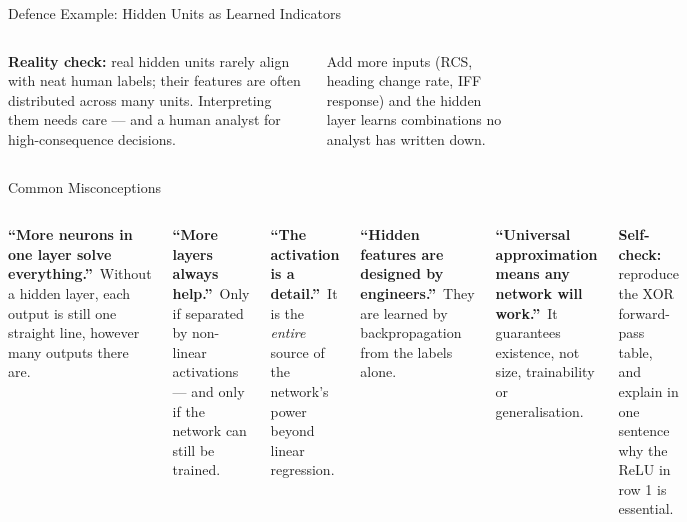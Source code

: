 \documentclass[aspectratio=169,10pt]{beamer}
\begin{document}
\begin{frame}{Defence Example: Hidden Units as Learned Indicators}
\begin{columns}[T]
\begin{wbox}\scriptsize\textbf{Reality check:} real hidden units rarely align with neat human labels; their features are often distributed across many units. Interpreting them needs care --- and a human analyst for high-consequence decisions.\end{wbox}
\begin{ibox}\scriptsize Add more inputs (RCS, heading change rate, IFF response) and the hidden layer learns combinations no analyst has written down.\end{ibox}
\end{columns}
\end{frame}

\begin{frame}{Common Misconceptions}
\begin{columns}[T]
\begin{wbox}\textbf{``More neurons in one layer solve everything.''}\ \scriptsize Without a hidden layer, each output is still one straight line, however many outputs there are.\end{wbox}
\begin{wbox}\textbf{``More layers always help.''}\ \scriptsize Only if separated by non-linear activations --- and only if the network can still be trained.\end{wbox}
\begin{wbox}\textbf{``The activation is a detail.''}\ \scriptsize It is the \emph{entire} source of the network's power beyond linear regression.\end{wbox}
\begin{wbox}\textbf{``Hidden features are designed by engineers.''}\ \scriptsize They are learned by backpropagation from the labels alone.\end{wbox}
\begin{wbox}\textbf{``Universal approximation means any network will work.''}\ \scriptsize It guarantees existence, not size, trainability or generalisation.\end{wbox}
\begin{ibox}\scriptsize\textbf{Self-check:} reproduce the XOR forward-pass table, and explain in one sentence why the ReLU in row 1 is essential.\end{ibox}
\end{columns}
\end{frame}
\end{document}
